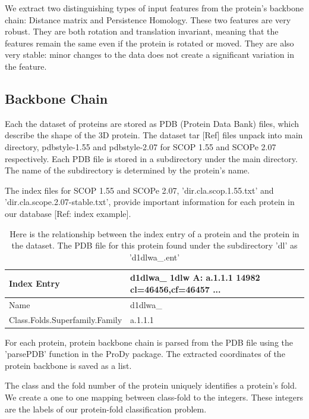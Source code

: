 \documentclass[12pt, a4paper, twocolumn, fullpage]{article}
\theoremstyle{plain}
\theoremstyle{definition}
\theoremstyle{remark}
\begin{document}
We extract two distinguishing types of input features from the protein's backbone chain: Distance matrix and Persistence Homology. These two features are very robust. They are both rotation and translation invariant, meaning that the features remain the same even if the protein is rotated or moved. They are also very stable: minor changes to the data does not create a significant variation in the feature.
    
\subsection{ Backbone Chain}
Each the dataset of proteins are stored as PDB (Protein Data Bank) files, which describe the shape of the 3D protein. The dataset tar [Ref] files unpack into main directory, pdbstyle-1.55 and pdbstyle-2.07 for SCOP 1.55 and SCOPe 2.07 respectively. Each PDB file is stored in a subdirectory under the main directory. The name of the subdirectory is determined by the protein's name.

The index files for SCOP 1.55 and SCOPe 2.07, 'dir.cla.scop.1.55.txt' and 'dir.cla.scope.2.07-stable.txt', provide important information for each protein in our database [Ref: index example]. 

\begin{table}[h]
    \centering
    \begin{tabular}{| l | l|}
        \hline 
        Index Entry & d1dlwa\_ 1dlw    A:  a.1.1.1 14982	cl=46456,cf=46457 ... \\ \hline
        Name & d1dlwa\_     \\ \hline
        Class.Folds.Superfamily.Family & a.1.1.1    \\ \hline
    \end{tabular}
    \caption{ Here is the relationship between the index entry of a protein and the protein in the dataset. The PDB file for this protein found under the subdirectory 'dl' as 'd1dlwa\_.ent'}
    \label{tbl:Index Entry}
\end{table}

For each protein, protein backbone chain is parsed from the PDB file using the 'parsePDB' function in the ProDy package. The extracted coordinates of the protein backbone is saved as a list. 

The class and the fold number of the protein uniquely identifies a protein's fold. We create a one to one mapping between class-fold to the integers. These integers are the labels of our protein-fold classification problem.
\end{document}
